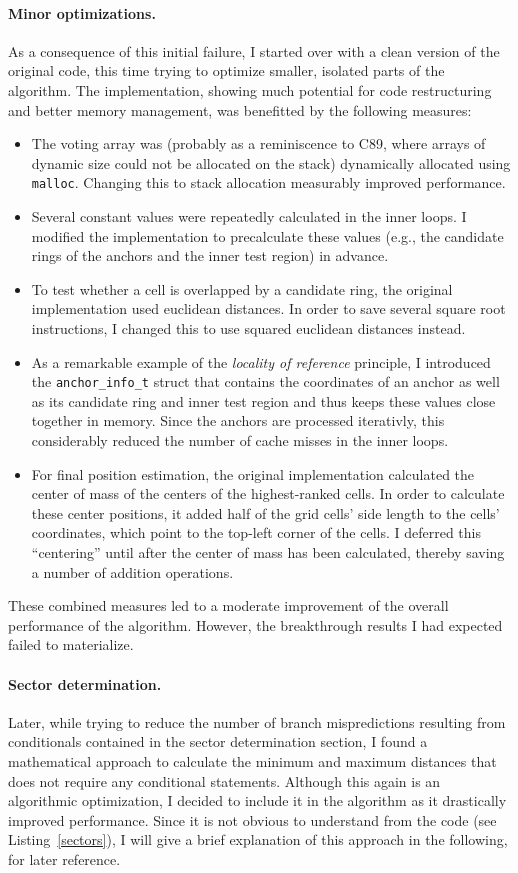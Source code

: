 \paragraph{Minor optimizations.}
As a consequence of this initial failure, I started over with a clean version of the original code, this time trying to optimize smaller, isolated parts of the algorithm. The implementation, showing much potential for code restructuring and better memory management, was benefitted by the following measures:
\begin{itemize}
\item The voting array was (probably as a reminiscence to C89, where arrays of dynamic size could not be allocated on the stack) dynamically allocated using \texttt{malloc}. Changing this to stack allocation measurably improved performance.
\item Several constant values were repeatedly calculated in the inner loops. I modified the implementation to precalculate these values (e.g., the candidate rings of the anchors and the inner test region) in advance.
\item To test whether a cell is overlapped by a candidate ring, the original implementation used euclidean distances. In order to save several square root instructions, I changed this to use squared euclidean distances instead.
\item As a remarkable example of the \emph{locality of reference} principle, I introduced the \texttt{anchor\_info\_t} struct that contains the coordinates of an anchor as well as its candidate ring and inner test region and thus keeps these values close together in memory. Since the anchors are processed iterativly, this considerably reduced the number of cache misses in the inner loops.
\item For final position estimation, the original implementation calculated the center of mass of the centers of the highest-ranked cells. In order to calculate these center positions, it added half of the grid cells' side length to the cells' coordinates, which point to the top-left corner of the cells. I deferred this ``centering'' until after the center of mass has been calculated, thereby saving a number of addition operations.
\end{itemize}
These combined measures led to a moderate improvement of the overall performance of the algorithm. However, the breakthrough results I had expected failed to materialize.

\paragraph{Sector determination.}
Later, while trying to reduce the number of branch mispredictions resulting from conditionals contained in the sector determination section, I found a mathematical approach to calculate the minimum and maximum distances that does not require any conditional statements. Although this again is an algorithmic optimization, I decided to include it in the algorithm as it drastically improved performance. Since it is not obvious to understand from the code (see Listing~\ref{sectors}), I will give a brief explanation of this approach in the following, for later reference.

